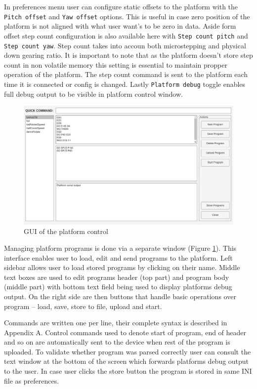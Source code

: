 In preferences menu user can configure static offsets to the platform with the \texttt{Pitch offset} and \texttt{Yaw offset} options.
This is useful in case zero position of the platform is not aligned with what user want's to be zero in data.
Aside form offset step count configuration is also available here with \texttt{Step count pitch} and \texttt{Step count yaw}.
Step count takes into accoun both microstepping and physical down gearing ratio.
It is important to note that as the platform doesn't store step count in non volatile memory this setting is essential to maintain propper operation of the platform.
The step count command is sent to the platform each time it is connected or config is changed.
Lastly \texttt{Platform debug} toggle enables full debug output to be visible in platform control window.

\begin{figure}[h!]
  \centering
  \includegraphics[width=\textwidth]{../img/platform_control.jpg}
  \caption[GUI of the platform control]{GUI of the platform control}
  \label{fig:platformControl}
\end{figure}

Managing platform programs is done via a separate window (Figure \ref{fig:platformControl}).
This interface enables user to load, edit and send programs to the platform.
Left sidebar allows user to load stored programs by clicking on their name.
Middle text boxes are used to edit programs header (top part) and program body (middle part) with bottom text field being used to display platforms debug output.
On the right side are then buttons that handle basic operations over program -- load, save, store to file, upload and start.

Commands are written one per line, their complete syntax is described in Appendix A.
Control commands used to denote start of program, end of header and so on are automatically sent to the device when rest of the program is uploaded.
To validate whether program was parsed correctly user can consult the text window at the bottom of the screen which forwards platforms debug output to the user.
In case user clicks the store button the program is stored in same INI file as preferences.


